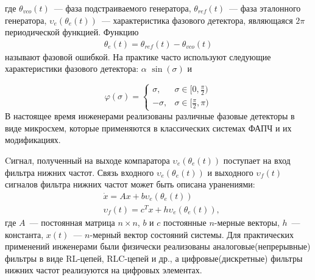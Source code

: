 \documentclass[a4paper,14pt]{article} %
\begin{document}
где $\theta_{vco}(t)$~--- фаза подстраиваемого генератора, $\theta_{ref}(t)$~--- фаза эталонного генератора, $\upsilon_e(\theta_e(t))$~--- характеристика фазового детектора, являющаяся $2\pi$ периодической функцией. Функцию
 \begin{equation*}
 \begin{aligned}
\theta_e(t) = \theta_{ref}(t) - \theta_{vco}(t)
 \end{aligned}
\end{equation*}
называют фазовой ошибкой. На практике часто используют следующие характеристики фазового детектора: $\alpha$ $\operatorname{sin}(\sigma)$ и 

\begin{equation*}
\varphi(\sigma) = 
 \begin{cases}
   \sigma, &\text{$\sigma \in [0,  \frac{\pi}{2})$}\\
   -\sigma, &\text{$\sigma \in [\frac{\pi}{2},  \pi)$}
 \end{cases}
\end{equation*}
В настоящее время инженерами реализованы различные фазовые детекторы в виде микросхем, которые применяются в классических системах ФАПЧ и их модификациях.

Cигнал, полученный на выходе компаратора $\upsilon_e(\theta_e(t))$ поступает на вход фильтра нижних частот. Связь входного $\upsilon_e(\theta_e(t))$ и выходного $\upsilon_f(t)$ сигналов фильтра нижних частот может быть описана уранениями:
 \begin{equation*}
 \begin{aligned}
&\dot{x} = Ax + b\upsilon_e(\theta_e(t))\\
&\upsilon_f(t) = c^Tx + h\upsilon_e(\theta_e(t)),
 \end{aligned}
\end{equation*}
где $A$~--- постоянная матрица $n \times n$, $b$ и $c$ постоянные $n$-мерные векторы, $h$~--- константа, $x(t)$~--- $n$-мерный вектор состояний системы. Для практических применений инженерами были физически реализованы аналоговые(непрерывные) фильтры в виде RL-цепей, RLC-цепей и др., а цифровые(дискретные) фильтры нижних частот реализуются на цифровых элементах.
\end{document}
